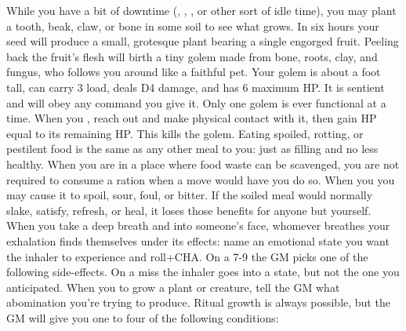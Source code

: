 \documentclass[darkmode]{dw_playbook}
\begin{document}
    {
            {While you have a bit of downtime (, , , or other sort of idle time), you may plant a tooth, beak, claw, or bone in some soil to see what grows.  In six hours your seed will produce a small, grotesque plant bearing a single engorged fruit.  Peeling back the fruit’s flesh will birth a tiny golem made from bone, roots, clay, and fungus, who follows you around like a faithful pet.
            \gap
            Your golem is about a foot tall, can carry 3 load, deals D4 damage, and has 6 maximum HP.  It is sentient and will obey any command you give it.  Only one golem is ever functional at a time.}
        \gap
            {When you , reach out and make physical contact with it, then gain HP equal to its remaining HP.  This kills the golem.}
        \gap
            {Eating spoiled, rotting, or pestilent food is the same as any other meal to you: just as filling and no less healthy.  When you are in a place where food waste can be scavenged, you are not required to consume a ration when a move would have you do so.
            \gap
            When you  you may cause it to spoil, sour, foul, or bitter.  If the soiled meal would normally slake, satisfy, refresh, or heal, it loses those benefits for anyone but yourself.}
            {When you take a deep breath and  into someone’s face, whomever breathes your exhalation finds themselves under its effects: name an emotional state you want the inhaler to experience and roll+CHA.  On a 7-9 the GM picks one of the following side-effects.  On a miss the inhaler goes into a state, but not the one you anticipated.
            \gapSm
            }
        \gap
            {When you  to grow a plant or creature, tell the GM what abomination you’re trying to produce.  Ritual growth is always possible, but the GM will give you one to four of the following conditions:
            \gapSm
            \gapSm
            \gapSm
            \gapSm
            \gapSm
            \gapSm
            }
    }
\end{document}
